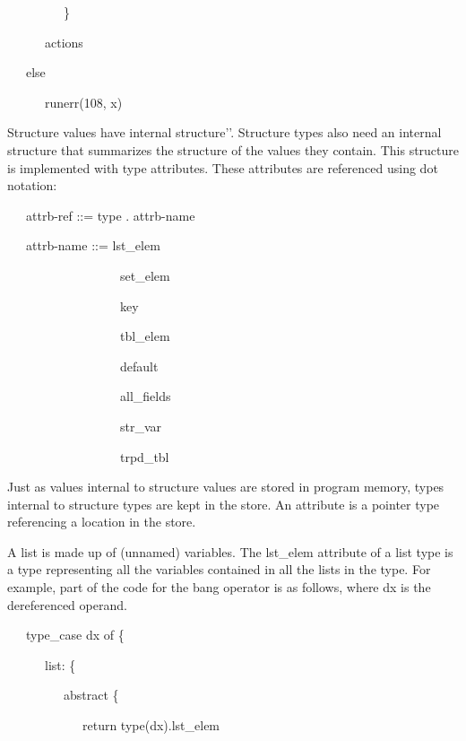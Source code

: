 {\ttfamily\mdseries
\ \ \ \ \ \ \ \ \ \}}

{\ttfamily\mdseries
\ \ \ \ \ \ actions}

{\ttfamily\mdseries
\ \ \ else}

{\ttfamily\mdseries
\ \ \ \ \ \ runerr(108, x)}


Structure values have internal
{\textasciigrave}{\textasciigrave}structure'{}'. Structure types also
need an internal structure that summarizes the structure of the values
they contain. This structure is implemented with type attributes.
These attributes are referenced using dot notation:

{\ttfamily\mdseries
\ \ \ attrb-ref ::= type . attrb-name}

{\ttfamily\mdseries
\ \ \ attrb-name ::= lst\_elem {\textbar}}

{\ttfamily\mdseries
\ \ \ \ \ \ \ \ \ \ \ \ \ \ \ \ \ \ set\_elem {\textbar}}

{\ttfamily\mdseries
\ \ \ \ \ \ \ \ \ \ \ \ \ \ \ \ \ \ key {\textbar}}

{\ttfamily\mdseries
\ \ \ \ \ \ \ \ \ \ \ \ \ \ \ \ \ \ tbl\_elem {\textbar}}

{\ttfamily\mdseries
\ \ \ \ \ \ \ \ \ \ \ \ \ \ \ \ \ \ default {\textbar}}

{\ttfamily\mdseries
\ \ \ \ \ \ \ \ \ \ \ \ \ \ \ \ \ \ all\_fields {\textbar}}

{\ttfamily\mdseries
\ \ \ \ \ \ \ \ \ \ \ \ \ \ \ \ \ \ str\_var {\textbar}}

{\ttfamily\mdseries
\ \ \ \ \ \ \ \ \ \ \ \ \ \ \ \ \ \ trpd\_tbl}


Just as values internal to structure values are stored in program
memory, types internal to structure types are kept in the store. An
attribute is a pointer type referencing a location in the store.

A list is made up of (unnamed) variables. The lst\_elem attribute of a
list type is a type representing all the variables contained in all
the lists in the type. For example, part of the code for the bang
operator is as follows, where dx is the dereferenced operand.

{\ttfamily\mdseries
\ \ \ type\_case dx of \{}

{\ttfamily\mdseries
\ \ \ \ \ \ list: \{}

{\ttfamily\mdseries
\ \ \ \ \ \ \ \ \ abstract \{}

{\ttfamily\mdseries
\ \ \ \ \ \ \ \ \ \ \ \ return type(dx).lst\_elem}

